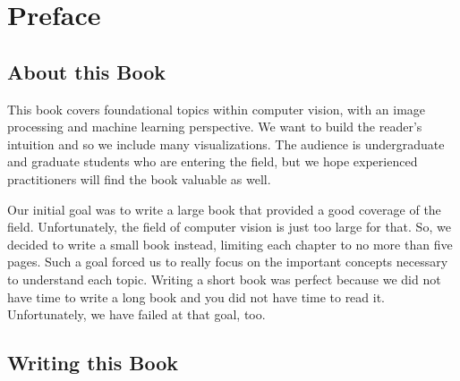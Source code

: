 \chapter*{Preface}


\section*{About this Book}

This book  covers foundational topics within computer vision, with an image processing and machine learning perspective. We want to build the reader's intuition and so we include many visualizations. The audience is undergraduate and graduate students who are entering the field, but we hope experienced practitioners will find the book valuable as well.



Our initial goal was to write a large book that provided a good coverage of the field. Unfortunately, the field of computer vision is just too large for that.  So, we decided to write a small book instead, limiting each chapter to no more than five pages. Such a goal forced us to really focus on the important concepts necessary to understand each topic. Writing a short book was perfect because we did not have time to write a long book and you did not have time to read it. Unfortunately, we have failed at that goal, too. %

% 
\section*{Writing this Book}

